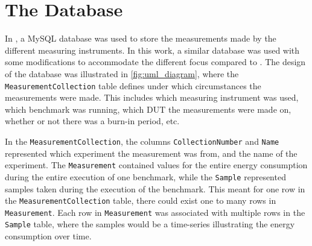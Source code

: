 \section{The Database}\label{app:database}

In \cite{biksbois}, a MySQL database was used to store the measurements made by the different measuring instruments. In this work, a similar database was used with some modifications to accommodate the different focus compared to \cite{biksbois}. The design of the database was illustrated in \cref{fig:uml_diagram}, where the \texttt{MeasurementCollection} table defines under which circumstances the measurements were made. This includes which measuring instrument was used, which benchmark was running, which DUT the measurements were made on, whether or not there was a burn-in period, etc.



In the \texttt{MeasurementCollection}, the columns \texttt{CollectionNumber} and \texttt{Name} represented which experiment the measurement was from, and the name of the experiment. The \texttt{Measurement} contained values for the entire energy consumption during the entire execution of one benchmark, while the \texttt{Sample} represented samples taken during the execution of the benchmark. This meant for one row in the \texttt{MeasurementCollection} table, there could exist one to many rows in \texttt{Measurement}. Each row in \texttt{Measurement} was associated with multiple rows in the \texttt{Sample} table, where the samples would be a time-series illustrating the energy consumption over time.

